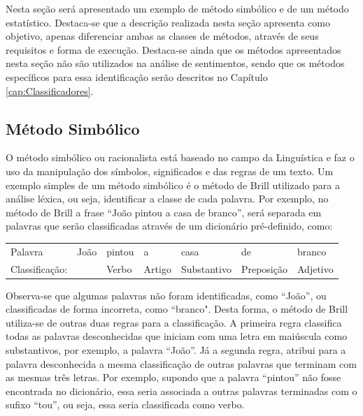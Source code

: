 Nesta seção será apresentado um exemplo de método simbólico e de um método
estatístico.
Destaca-se que a descrição realizada nesta seção apresenta como objetivo, apenas
diferenciar ambas as classes de métodos, através de seus requisitos e forma de execução.
Destaca-se ainda que os métodos apresentados nesta seção não são utilizados na
análise de sentimentos, sendo que os métodos específicos para essa
identificação serão descritos no Capítulo \ref{cap:Classificadores}.


\subsection{Método Simbólico}
O método simbólico ou racionalista está
baseado no campo da Linguística e faz o uso da manipulação dos símbolos,
significados e das regras de um texto. Um exemplo simples de um método simbólico
é o método de Brill \cite{Brill:1992:SRP:974499.974526} utilizado para a
análise léxica, ou seja, identificar a classe de cada palavra.
Por exemplo, no método de Brill a frase ``João pintou a casa de branco'', será separada em palavras que
serão classificadas através de um dicionário pré-definido, como:

\begin{table}[htb]
\centering
\begin{tabular}{l|l|l|l|l|l|l}
Palavra         & João        & pintou & a      & casa        & de
& branco
\\
Classificação:   & 			   & Verbo  & Artigo & Substantivo & Preposição & Adjetivo
\end{tabular}
\label{my-label}
\end{table}

Observa-se que algumas palavras não foram
identificadas, como ``João'', ou classificadas de forma incorreta, como
``branco". Desta forma, o método de Brill utiliza-se de outras duas regras para
a classificação.
A primeira regra classifica todas as palavras desconhecidas que iniciam com uma
letra em maiúscula como substantivos, por exemplo, a palavra ``João''. Já a
segunda regra, atribui para a palavra desconhecida a mesma classificação de outras palavras que terminam com as mesmas três letras. Por exemplo, supondo
que a palavra ``pintou'' não fosse encontrada no dicionário, essa seria
associada a outras palavras terminadas com o sufixo ``tou'', ou seja, essa seria
classificada como verbo.

